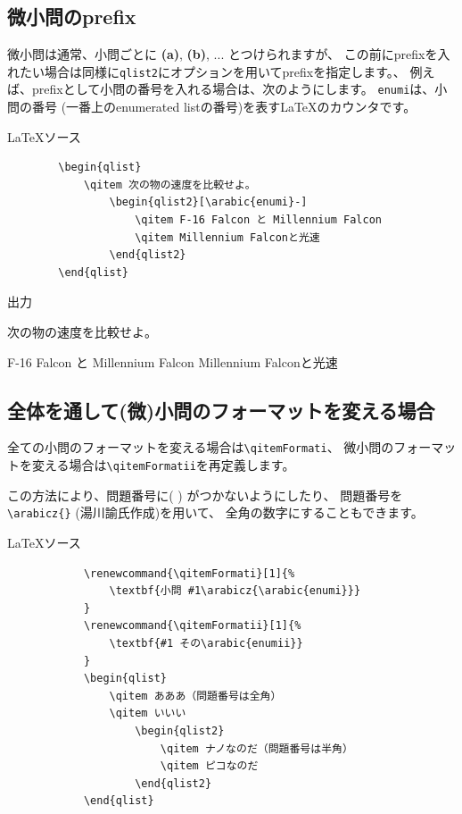 \documentclass[dvipdfmx,a4j,11pt]{jarticle}
\newenvironment{inputbox}{%
	\begin{itembox}[r]{\LaTeX ソース}
}{
	\end{itembox}
}
\newenvironment{outputbox}{%
	\begin{itembox}[r]{出力}
}{%
	\end{itembox}
}
\begin{document}
\subsection{微小問のprefix}
	微小問は通常、小問ごとに {\bf (a)}, {\bf (b)}, ... とつけられますが、
	この前にprefixを入れたい場合は同様に{\tt qlist2}にオプションを用いてprefixを指定します。、
	例えば、prefixとして小問の番号を入れる場合は、次のようにします。
	{\tt enumi}は、小問の番号 (一番上のenumerated listの番号)を表す\LaTeX のカウンタです。
	
	\begin{inputbox}
		\begin{verbatim}
		\begin{qlist}
		    \qitem 次の物の速度を比較せよ。
		        \begin{qlist2}[\arabic{enumi}-]
		            \qitem F-16 Falcon と Millennium Falcon
		            \qitem Millennium Falconと光速
		        \end{qlist2}
		\end{qlist}
		\end{verbatim}
	\end{inputbox}
	
	\begin{outputbox}
		\begin{qlist}
		    \qitem 次の物の速度を比較せよ。
		        \begin{qlist2}
		            \qitem F-16 Falcon と Millennium Falcon
		            \qitem Millennium Falconと光速
		        \end{qlist2}
		\end{qlist}
	\end{outputbox}
	


\subsection{全体を通して(微)小問のフォーマットを変える場合}
	全ての小問のフォーマットを変える場合は{\tt \verb"\qitemFormati"}、
	微小問のフォーマットを変える場合は{\tt \verb"\qitemFormatii"}を再定義します。
	
	この方法により、問題番号に( ) がつかないようにしたり、
	問題番号を\verb"\arabicz{}" (湯川諭氏作成)を用いて、
	全角の数字にすることもできます。
	\begin{inputbox}
		\begin{verbatim}
			\renewcommand{\qitemFormati}[1]{%
			    \textbf{小問 #1\arabicz{\arabic{enumi}}}
			}
			\renewcommand{\qitemFormatii}[1]{%
			    \textbf{#1 その\arabic{enumii}}
			}
			\begin{qlist}
			    \qitem あああ（問題番号は全角）
			    \qitem いいい
			        \begin{qlist2}
			            \qitem ナノなのだ（問題番号は半角）
			            \qitem ピコなのだ
			        \end{qlist2}
			\end{qlist}
		\end{verbatim}
	\end{inputbox}
	
\end{document}
